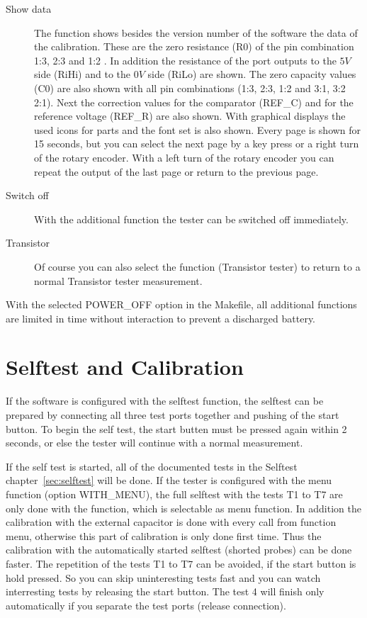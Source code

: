 \begin{description}
 \item[Show data]
 The function  shows besides the version number of the software the data of the calibration.
These are the zero resistance (R0) of the pin combination 1:3, 2:3 and 1:2 .
In addition the resistance of the port outputs to the \(5V\) side (RiHi) and
to the \(0V\) side (RiLo) are shown.
The zero capacity values (C0) are also shown with all pin combinations (1:3, 2:3, 1:2 and 3:1, 3:2 2:1).
Next the correction values for the comparator (REF\_C) and for the reference voltage (REF\_R) are also shown.
With graphical displays the used icons for parts and the font set is also shown.
Every page is shown for 15 seconds, but you can select the next page by a key press or a right turn of the rotary encoder.
With a left turn of the rotary encoder you can repeat the output of the last page or return to the previous page.


\item[Switch off]
With the additional function  the tester can be switched off immediately.\\

\item[Transistor]
Of course you can also select the function  (Transistor tester) to return to a normal Transistor tester measurement. 
\end{description}

With the selected POWER\_OFF option in the Makefile, all additional functions are limited in time without interaction to prevent a discharged battery.


\section{Selftest and Calibration}

If the software is configured with the selftest function, the selftest can be prepared by connecting all three
test ports together and pushing of the start button.
To begin the self test, the start butten must be pressed again within 2 seconds, or else the tester will continue
with a normal measurement.

If the self test is started, all of the documented tests in the Selftest chapter~\ref{sec:selftest} will be done.
If the tester is configured with the menu function (option WITH\_MENU), 
the full selftest with the tests T1 to T7 are only done with the  function, 
which is selectable as menu function.
In addition the calibration with the external capacitor is done with every call from function menu,
otherwise this part of calibration is only done first time.
Thus the calibration with the automatically started selftest (shorted probes) can be done faster.
The repetition of the tests T1 to T7 can be avoided, if the start button is hold pressed.
So you can skip uninteresting tests fast and you can watch interresting tests by releasing the start button.
The test 4 will finish only automatically if you separate the test ports (release connection).

